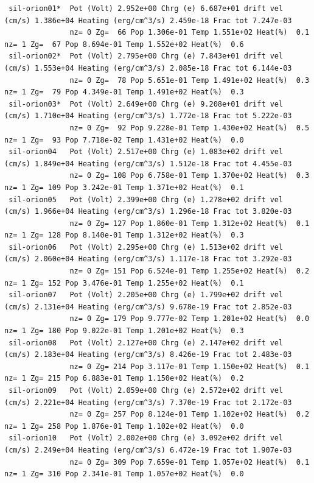 {\begin{verbatim}
 sil-orion01*  Pot (Volt) 2.952e+00 Chrg (e) 6.687e+01 drift vel (cm/s) 1.386e+04 Heating (erg/cm^3/s) 2.459e-18 Frac tot 7.247e-03
               nz= 0 Zg=  66 Pop 1.306e-01 Temp 1.551e+02 Heat(%)  0.1      nz= 1 Zg=  67 Pop 8.694e-01 Temp 1.552e+02 Heat(%)  0.6
 sil-orion02*  Pot (Volt) 2.795e+00 Chrg (e) 7.843e+01 drift vel (cm/s) 1.553e+04 Heating (erg/cm^3/s) 2.085e-18 Frac tot 6.144e-03
               nz= 0 Zg=  78 Pop 5.651e-01 Temp 1.491e+02 Heat(%)  0.3      nz= 1 Zg=  79 Pop 4.349e-01 Temp 1.491e+02 Heat(%)  0.3
 sil-orion03*  Pot (Volt) 2.649e+00 Chrg (e) 9.208e+01 drift vel (cm/s) 1.710e+04 Heating (erg/cm^3/s) 1.772e-18 Frac tot 5.222e-03
               nz= 0 Zg=  92 Pop 9.228e-01 Temp 1.430e+02 Heat(%)  0.5      nz= 1 Zg=  93 Pop 7.718e-02 Temp 1.431e+02 Heat(%)  0.0
 sil-orion04   Pot (Volt) 2.517e+00 Chrg (e) 1.083e+02 drift vel (cm/s) 1.849e+04 Heating (erg/cm^3/s) 1.512e-18 Frac tot 4.455e-03
               nz= 0 Zg= 108 Pop 6.758e-01 Temp 1.370e+02 Heat(%)  0.3      nz= 1 Zg= 109 Pop 3.242e-01 Temp 1.371e+02 Heat(%)  0.1
 sil-orion05   Pot (Volt) 2.399e+00 Chrg (e) 1.278e+02 drift vel (cm/s) 1.966e+04 Heating (erg/cm^3/s) 1.296e-18 Frac tot 3.820e-03
               nz= 0 Zg= 127 Pop 1.860e-01 Temp 1.312e+02 Heat(%)  0.1      nz= 1 Zg= 128 Pop 8.140e-01 Temp 1.312e+02 Heat(%)  0.3
 sil-orion06   Pot (Volt) 2.295e+00 Chrg (e) 1.513e+02 drift vel (cm/s) 2.060e+04 Heating (erg/cm^3/s) 1.117e-18 Frac tot 3.292e-03
               nz= 0 Zg= 151 Pop 6.524e-01 Temp 1.255e+02 Heat(%)  0.2      nz= 1 Zg= 152 Pop 3.476e-01 Temp 1.255e+02 Heat(%)  0.1
 sil-orion07   Pot (Volt) 2.205e+00 Chrg (e) 1.799e+02 drift vel (cm/s) 2.131e+04 Heating (erg/cm^3/s) 9.678e-19 Frac tot 2.852e-03
               nz= 0 Zg= 179 Pop 9.777e-02 Temp 1.201e+02 Heat(%)  0.0      nz= 1 Zg= 180 Pop 9.022e-01 Temp 1.201e+02 Heat(%)  0.3
 sil-orion08   Pot (Volt) 2.127e+00 Chrg (e) 2.147e+02 drift vel (cm/s) 2.183e+04 Heating (erg/cm^3/s) 8.426e-19 Frac tot 2.483e-03
               nz= 0 Zg= 214 Pop 3.117e-01 Temp 1.150e+02 Heat(%)  0.1      nz= 1 Zg= 215 Pop 6.883e-01 Temp 1.150e+02 Heat(%)  0.2
 sil-orion09   Pot (Volt) 2.059e+00 Chrg (e) 2.572e+02 drift vel (cm/s) 2.221e+04 Heating (erg/cm^3/s) 7.370e-19 Frac tot 2.172e-03
               nz= 0 Zg= 257 Pop 8.124e-01 Temp 1.102e+02 Heat(%)  0.2      nz= 1 Zg= 258 Pop 1.876e-01 Temp 1.102e+02 Heat(%)  0.0
 sil-orion10   Pot (Volt) 2.002e+00 Chrg (e) 3.092e+02 drift vel (cm/s) 2.249e+04 Heating (erg/cm^3/s) 6.472e-19 Frac tot 1.907e-03
               nz= 0 Zg= 309 Pop 7.659e-01 Temp 1.057e+02 Heat(%)  0.1      nz= 1 Zg= 310 Pop 2.341e-01 Temp 1.057e+02 Heat(%)  0.0

\end{verbatim}}
